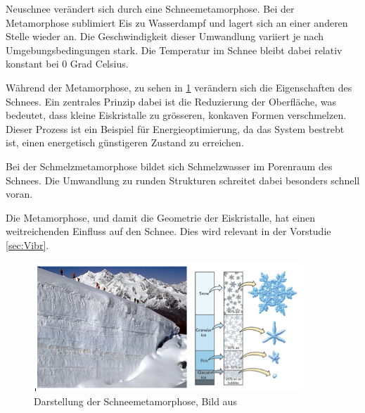 Neuschnee verändert sich durch eine Schneemetamorphose. Bei der Metamorphose sublimiert Eis zu Wasserdampf und lagert sich an einer anderen Stelle wieder an. Die Geschwindigkeit dieser Umwandlung variiert je nach Umgebungsbedingungen stark. Die Temperatur im Schnee bleibt dabei relativ konstant bei 0 Grad Celsius.


Während der Metamorphose, zu sehen in \ref{fig:Metha} verändern sich die Eigenschaften des Schnees. Ein zentrales Prinzip dabei ist die Reduzierung der Oberfläche, was bedeutet, dass kleine Eiskristalle zu grösseren, konkaven Formen verschmelzen. Dieser Prozess ist ein Beispiel für Energieoptimierung, da das System bestrebt ist, einen energetisch günstigeren Zustand zu erreichen.

Bei der Schmelzmetamorphose bildet sich Schmelzwasser im Porenraum des Schnees. Die Umwandlung zu runden Strukturen schreitet dabei besonders schnell voran. \cite{WSLSLFMetha.2024}

Die Metamorphose, und damit die Geometrie der Eiskristalle, hat einen weitreichenden Einfluss auf den Schnee. Dies wird relevant in der Vorstudie \ref{sec:Vibr}.

\begin{figure}[H]
    \centering
    \includegraphics[width=0.9\textwidth]{Bilder/gletscher_eis_schnee.png}
    \caption{Darstellung der Schneemetamorphose, Bild aus \cite{Wetterdienst.6222017}}
    \label{fig:Metha}
\end{figure}
